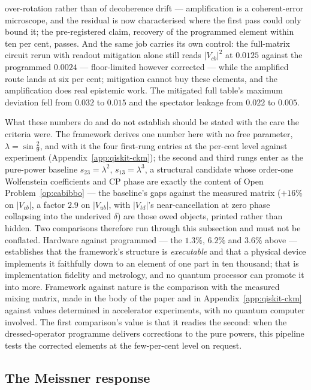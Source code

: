 over-rotation rather than of decoherence drift --- amplification is a coherent-error microscope,
and the residual is now characterised where the first pass could only bound it; the pre-registered
claim, recovery of the programmed element within ten per cent, passes. And the same job carries
its own control: the full-matrix circuit rerun with readout mitigation alone still reads
$|V_{cb}|^{2}$ at $0.0125$ against the programmed $0.0024$ --- floor-limited however corrected ---
while the amplified route lands at six per cent; mitigation cannot buy these elements, and the
amplification does real epistemic work. The mitigated full table's maximum deviation fell from
$0.032$ to $0.015$ and the spectator leakage from $0.022$ to $0.005$.

What these numbers do and do not establish should be stated with the care the criteria were. The
framework derives one number here with no free parameter, $\lambda = \sin\tfrac29$, and with it
the four first-rung entries at the per-cent level against experiment
(Appendix~\ref{app:qiskit-ckm}); the second and third rungs enter as the pure-power baseline
$s_{23} = \lambda^{2}$, $s_{13} = \lambda^{3}$, a structural candidate whose order-one Wolfenstein
coefficients and CP phase are exactly the content of Open Problem~\ref{op:cabibbo} --- the
baseline's gaps against the measured matrix ($+16\%$ on $|V_{cb}|$, a factor $2.9$ on $|V_{ub}|$,
with $|V_{td}|$'s near-cancellation at zero phase collapsing into the underived $\delta$) are
those owed objects, printed rather than hidden. Two comparisons therefore run through this
subsection and must not be conflated. Hardware against programmed --- the $1.3\%$, $6.2\%$ and
$3.6\%$ above --- establishes that the framework's structure is \emph{executable} and that a
physical device implements it faithfully down to an element of one part in ten thousand; that is
implementation fidelity and metrology, and no quantum processor can promote it into more.
Framework against nature is the comparison with the measured mixing matrix, made in the body of
the paper and in Appendix~\ref{app:qiskit-ckm} against values determined in accelerator
experiments, with no quantum computer involved. The first comparison's value is that it readies
the second: when the dressed-operator programme delivers corrections to the pure powers, this
pipeline tests the corrected elements at the few-per-cent level on request.

\subsection{The Meissner response}
\label{app:hw-meissner}


